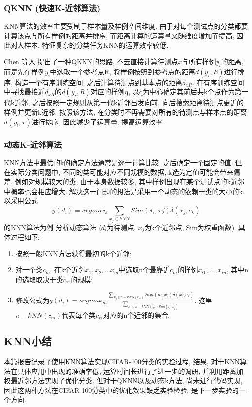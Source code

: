 \documentclass[lang=cn, 11pt,   a4paper]{elegantpaper}
\begin{document}
\subsubsection{QKNN (快速K-近邻算法)}
KNN算法的效率主要受制于样本量及样例空间维度. 由于对每个测试点的分类都要计算该点与所有样例的距离并排序,  而距离计算的运算量又随维度增加而提高,  因此对大样本, 特征复杂的分类任务KNN的运算效率较低. 

Chen 等人 \cite{chen18} 提出了一种QKNN的思路,  不去直接计算待测点$x$与所有样例$y_{i}$的距离,  而是先在样例$y_{i}$中选取一个参考点R,  将样例按照到参考点的距离$d (y_{i},  R)$进行排序,  构造一个有序训练空间. 之后计算待测点到基本点的距离$d_{xR}$. 在有序训练空间中寻找最接近$d_{xR}$的$d (y_{i},  R)$对应的样例q,  以q为中心确定其前后共k个点作为第一代k近邻,  之后按照一定规则从第一代k近邻出发向前, 向后搜索距离待测点更近的样例并更新k近邻. 按照该方法,  在分类时不再需要对所有的待测点与样本点的距离$d (y_{i},  x)$进行排序,  因此减少了运算量,  提高运算效率. 

\subsubsection{动态K-近邻算法}
KNN方法中最优的k的确定方法通常是逐一计算比较,  之后确定一个固定的值. 但在实际分类问题中,  不同的类可能对应不同规模的数据,  k选为定值可能会带来偏差. 例如对规模较大的类,  由于本身数据较多,  其中样例出现在某个测试点的k近邻中概率也会相应增大. 解决这一问题的想法是采用一个动态的依赖于类的大小的k. 以采用公式$${y (d_{i}) = argmax_{k} \sum_{x_{j} \in kNN}{Sim (d_{i},  x{j}) \delta (x_{j},  c_{k})}}$$的KNN算法为例 \cite{chen18} 分析动态算法 ($d_{i}$为待测点,  $x_{j}$为k个近邻点,  Sim为权重函数),  具体过程如下: 
\begin{enumerate}
	\item 按照一般KNN方法获得最初的k个近邻;
	\item 对一个类$c_{m}$,  在k个近邻$x_{1},  x_{2},  ...x_{m}$中选取n个最靠近$c_{m}$的样例$x_{i1},  ...,  x_{in}$,  其中n的选取取决于类$c_{m}$的规模;
	\item 修改公式为$y (d_{i}) = argmax_{m} \frac{\sum_{x_{j} \in n-kNN (c_{m})}{Sim (d_{i},  x{j}) \delta (x_{j},  c_{k})}}{\sum_{x_{j} \in n-kNN (c_{m})Sim (d_{i},  x_{j})}}$. 这里$n-kNN (c_{m})$代表每个类$c_{m}$对应的n个近邻的集合.
\end{enumerate}

\subsection{KNN小结}
本篇报告记录了使用KNN算法实现CIFAR-100分类的实验过程, 结果,  对于KNN算法在具体应用中出现的准确率低, 运算时间长进行了进一步的调研, 并利用距离加权最近邻方法实现了优化分类. 但对于QKNN以及动态k方法, 尚未进行代码实现, 因此这两种方法在CIFAR-100分类中的优化效果缺乏实验检验, 是下一步实验的一个方向. 
\end{document}
